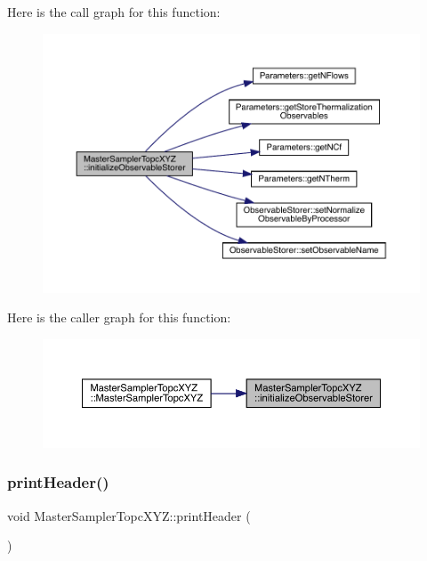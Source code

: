 Here is the call graph for this function\+:
\nopagebreak
\begin{figure}[H]
\begin{center}
\leavevmode
\includegraphics[width=350pt]{class_master_sampler_topc_x_y_z_af6d2cf2023d9626908fd26b07a7a0b84_cgraph}
\end{center}
\end{figure}
Here is the caller graph for this function\+:
\nopagebreak
\begin{figure}[H]
\begin{center}
\leavevmode
\includegraphics[width=350pt]{class_master_sampler_topc_x_y_z_af6d2cf2023d9626908fd26b07a7a0b84_icgraph}
\end{center}
\end{figure}
\mbox{\label{class_master_sampler_topc_x_y_z_a630a504ecbf3ceb517ebeefb39c3faff}} 
\subsubsection{\texorpdfstring{printHeader()}{printHeader()}}
{\footnotesize\ttfamily void Master\+Sampler\+Topc\+X\+Y\+Z\+::print\+Header (\begin{DoxyParamCaption}{ }\end{DoxyParamCaption})\hspace{0.3cm}{\ttfamily [virtual]}}



